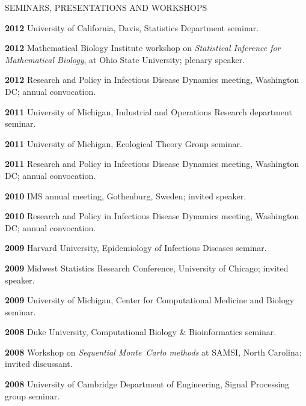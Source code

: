 \begin{mylist}{SEMINARS, PRESENTATIONS AND WORKSHOPS}
\item{\bf 2012 } University of California, Davis, Statistics Department seminar.

\item{\bf 2012 } Mathematical Biology Institute workshop on {\it Statistical Inference for Mathematical Biology}, at Ohio State University; plenary speaker.

\item{\bf 2012 } Research and Policy in Infectious Disease Dynamics meeting, Washington DC; annual convocation.

\item{\bf 2011 } University of Michigan, Industrial and Operations Research department seminar.

\item{\bf 2011 } University of Michigan, Ecological Theory Group seminar.

\item{\bf 2011 } Research and Policy in Infectious Disease Dynamics meeting, Washington DC; annual convocation.

\item{\bf 2010 } IMS annual meeting, Gothenburg, Sweden; invited speaker.

\item{\bf 2010 } Research and Policy in Infectious Disease Dynamics meeting, Washington DC; annual convocation.

\item{\bf 2009 } Harvard University, Epidemiology of Infectious Diseases seminar.

\item{\bf 2009 } Midwest Statistics Research Conference, University of Chicago;  invited speaker.

\item{\bf 2009 } University of Michigan, Center for Computational Medicine and Biology seminar.


\item{\bf 2008 } Duke University, Computational Biology \& Bioinformatics seminar.

\item{\bf 2008 } Workshop on {\it Sequential Monte~Carlo methods} at SAMSI, North Carolina; invited discussant.

\item{\bf 2008 } University of Cambridge Department of Engineering, Signal Processing group seminar.


\end{mylist}
